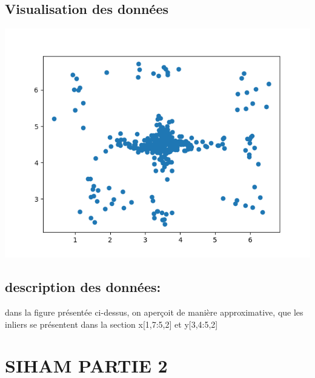 \documentclass[a4paper]{article}
\makeatletter
\newenvironment{expl}{%
  \begin{list}{}{%
      \small\itshape%
      \topsep\z@%
      \listparindent0pt%
      \parsep0.75\baselineskip%
      \setlength{\leftmargin}{20mm}%
      \setlength{\rightmargin}{20mm}%
    }
  \item[]}%
  {\end{list}}
\makeatother
\begin{document}
\subsection{Visualisation des données}
\includegraphics[width=\textwidth]{Figure_1.png}

\subsection{description des données:}
\begin{expl}
    dans la figure présentée ci-dessus, on aperçoit de manière approximative,  que les inliers se présentent dans la section  x[1,7:5,2]  et y[3,4:5,2]
\end{expl}

\section{SIHAM PARTIE 2}
\end{document}
